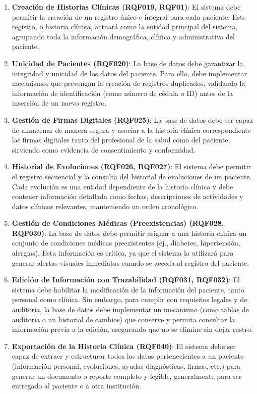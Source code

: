\documentclass[conference]{IEEEtran}
\begin{document}
\begin{enumerate}

    \item \textbf{Creación de Historias Clínicas (RQF019, RQF01)}: El sistema debe permitir la creación de un registro único e integral para cada paciente. Este registro, o historia clínica, actuará como la entidad principal del sistema, agrupando toda la información demográfica, clínica y administrativa del paciente.

    \item \textbf{Unicidad de Pacientes (RQF020)}: La base de datos debe garantizar la integridad y unicidad de los datos del paciente. Para ello, debe implementar mecanismos que prevengan la creación de registros duplicados, validando la información de identificación (como número de cédula o ID) antes de la inserción de un nuevo registro.

    \item \textbf{Gestión de Firmas Digitales (RQF025)}: La base de datos debe ser capaz de almacenar de manera segura y asociar a la historia clínica correspondiente las firmas digitales tanto del profesional de la salud como del paciente, sirviendo como evidencia de consentimiento y conformidad.

    \item \textbf{Historial de Evoluciones (RQF026, RQF027)}: El sistema debe permitir el registro secuencial y la consulta del historial de evoluciones de un paciente. Cada evolución es una entidad dependiente de la historia clínica y debe contener información detallada como fechas, descripciones de actividades y datos clínicos relevantes, manteniendo un orden cronológico.

    \item \textbf{Gestión de Condiciones Médicas (Preexistencias) (RQF028, RQF030)}: La base de datos debe permitir asignar a una historia clínica un conjunto de condiciones médicas preexistentes (ej., diabetes, hipertensión, alergias). Esta información es crítica, ya que el sistema la utilizará para generar alertas visuales inmediatas cuando se acceda al registro del paciente.

    \item \textbf{Edición de Información con Trazabilidad (RQF031, RQF032)}: El sistema debe habilitar la modificación de la información del paciente, tanto personal como clínica. Sin embargo, para cumplir con requisitos legales y de auditoría, la base de datos debe implementar un mecanismo (como tablas de auditoría o un historial de cambios) que conserve y permita consultar la información previa a la edición, asegurando que no se elimine sin dejar rastro.

    \item \textbf{Exportación de la Historia Clínica (RQF040)}: El sistema debe ser capaz de extraer y estructurar todos los datos pertenecientes a un paciente (información personal, evoluciones, ayudas diagnósticas, firmas, etc.) para generar un documento o reporte completo y legible, generalmente para ser entregado al paciente o a otra institución.

\end{enumerate}
\end{document}
